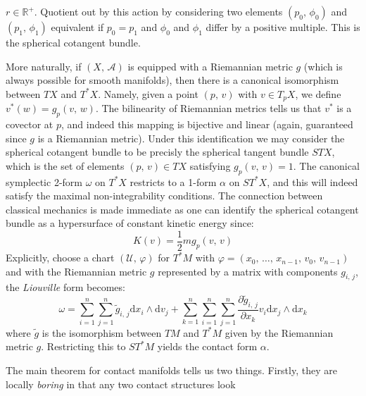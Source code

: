     $r\in\mathbb{R}^{+}$. Quotient out by this action by considering two
    elements $(p_{0},\,\phi_{0})$ and $(p_{1},\,\phi_{1})$ equivalent if
    $p_{0}=p_{1}$ and $\phi_{0}$ and $\phi_{1}$ differ by a positive multiple.
    This is the spherical cotangent bundle.
    \par\hfill\par
    More naturally, if $(X,\,\mathcal{A})$ is equipped with a Riemannian metric
    $g$ (which is always possible for smooth manifolds), then there is a
    canonical isomorphism between $TX$ and $T^{*}X$. Namely, given a point
    $(p,\,v)$ with $v\in{T}_{p}X$, we define
    $v^{*}(w)=g_{p}(v,\,w)$. The bilinearity of Riemannian metrics tells us
    that $v^{*}$ is a covector at $p$, and indeed this mapping is bijective
    and linear (again, guaranteed since $g$ is a Riemannian metric). Under this
    identification we may consider the spherical cotangent bundle to be
    precisly the spherical tangent bundle $STX$, which is the set of elements
    $(p,\,v)\in{TX}$ satisfying $g_{p}(v,\,v)=1$. The canonical symplectic
    2-form $\omega$ on $T^{*}X$ restricts to a 1-form $\alpha$ on
    $ST^{*}X$, and this will indeed satisfy the maximal non-integrability
    conditions. The connection between classical mechanics is made immediate
    as one can identify the spherical cotangent bundle as a hypersurface of
    constant kinetic energy since:
    \begin{equation}
        K(v)=\frac{1}{2}mg_{p}(v,\,v)
    \end{equation}
    Explicitly, choose a chart
    $(\mathcal{U},\,\varphi)$ for $T^{*}M$ with
    $\varphi=(x_{0},\,\dots,\,x_{n-1},\,v_{0},\,v_{n-1})$ and with the
    Riemannian metric $g$ represented by a matrix with components
    $g_{i,\,j}$, the \textit{Liouville} form becomes:
    \begin{equation}
        \omega=\sum_{i=1}^{n}\sum_{j=1}^{n}
            \tilde{g}_{i,\,j}\textrm{d}x_{i}\land\textrm{d}v_{j}+
        \sum_{k=1}^{n}\sum_{i=1}^{n}\sum_{j=1}^{n}
            \frac{\partial\tilde{g}_{i,\,j}}{\partial{x}_{k}}
            v_{i}\textrm{d}x_{j}\land\textrm{d}x_{k}
    \end{equation}
    where $\tilde{g}$ is the isomorphism between $TM$ and $T^{*}M$ given by
    the Riemannian metric $g$.
    Restricting this to $ST^{*}M$ yields the contact form $\alpha$.
    \par\hfill\par
    The main theorem for contact manifolds tells us two things. Firstly,
    they are locally \textit{boring} in that any two contact structures look
